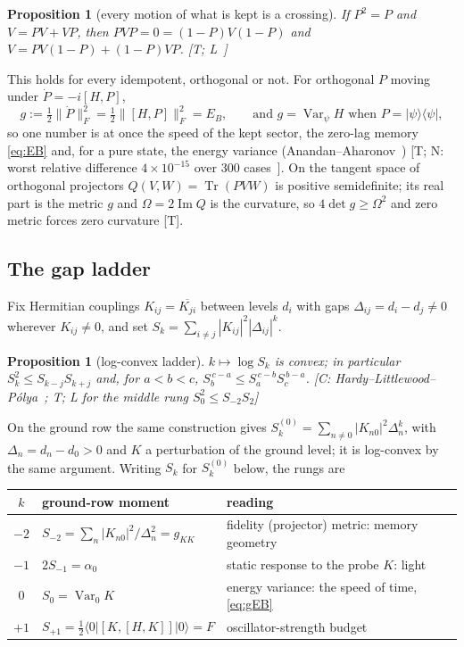 \documentclass[11pt]{article}
\newtheorem{proposition}[theorem]{Proposition}
\theoremstyle{definition}
\newcommand{\grade}[1]{\textsf{\small[#1]}}
\newcommand{\Tr}{\operatorname{Tr}}
\newcommand{\Var}{\operatorname{Var}}
\newcommand{\F}[1]{\lVert #1\rVert_F}
\begin{document}
\begin{proposition}[every motion of what is kept is a crossing]\label{prop:offdiag}
If $P^2=P$ and $V=PV+VP$, then $PVP=0=(1-P)V(1-P)$ and $V=PV(1-P)+(1-P)VP$. \grade{T; L~\cite{GLO,LKL}}
\end{proposition}

This holds for every idempotent, orthogonal or not. For orthogonal $P$ moving under $\dot P=-i[H,P]$,
\begin{equation}\label{eq:gEB}
g:=\tfrac12\F{\dot P}^2=\tfrac12\F{[H,P]}^2=E_B,\qquad\text{and }g=\Var_\psi H\text{ when }P=|\psi\rangle\langle\psi| ,
\end{equation}
so one number is at once the speed of the kept sector, the zero-lag memory \eqref{eq:EB} and, for a pure state, the energy variance (Anandan--Aharonov~\cite{AA}) \grade{T; N: worst relative difference $4\times10^{-15}$ over 300 cases~\cite{WB}}. On the tangent space of orthogonal projectors $Q(V,W)=\Tr(PVW)$ is positive semidefinite; its real part is the metric $g$ and $\Omega=2\operatorname{Im}Q$ is the curvature, so $4\det g\ge\Omega^2$ and zero metric forces zero curvature \grade{T}.

\subsection{The gap ladder}\label{sec:ladder}

Fix Hermitian couplings $K_{ij}=\overline{K_{ji}}$ between levels $d_i$ with gaps $\Delta_{ij}=d_i-d_j\ne0$ wherever $K_{ij}\ne0$, and set $S_k=\sum_{i\ne j}|K_{ij}|^2|\Delta_{ij}|^k$.

\begin{proposition}[log-convex ladder]\label{prop:ladder}
$k\mapsto\log S_k$ is convex; in particular $S_k^2\le S_{k-j}S_{k+j}$ and, for $a<b<c$, $S_b^{\,c-a}\le S_a^{\,c-b}S_c^{\,b-a}$. \grade{C: Hardy--Littlewood--P\'olya~\cite{HLP}; T; L for the middle rung $S_0^2\le S_{-2}S_2$}
\end{proposition}

On the ground row the same construction gives $S^{(0)}_k=\sum_{n\ne0}|K_{n0}|^2\Delta_n^k$, with $\Delta_n=d_n-d_0>0$ and $K$ a perturbation of the ground level; it is log-convex by the same argument. Writing $S_k$ for $S^{(0)}_k$ below, the rungs are

\begin{center}\begin{tabular}{cll}\toprule
$k$ & ground-row moment & reading\\\midrule
$-2$ & $S_{-2}=\sum_n|K_{n0}|^2/\Delta_n^2=g_{KK}$ & fidelity (projector) metric: memory geometry\\
$-1$ & $2S_{-1}=\alpha_0$ & static response to the probe $K$: light\\
$0$ & $S_0=\Var_0K$ & energy variance: the speed of time, \eqref{eq:gEB}\\
$+1$ & $S_{+1}=\tfrac12\langle0|[K,[H,K]]|0\rangle=F$ & oscillator-strength budget\\\bottomrule
\end{tabular}\end{center}
\end{document}
